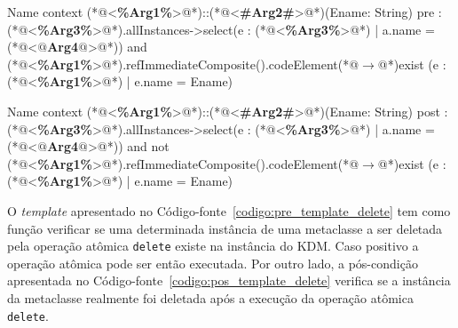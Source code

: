 \begin{codigo}[caption={[\textit{Template} OCL para realizar a pré-condição da operação atômica \texttt{delete}.] \textit{Template} OCL para realizar a pré-condição da operação atômica \texttt{delete}.},escapeinside={(*@}{@*)}, basicstyle=\footnotesize, label={codigo:pre_template_delete}, language=OCL]{Name}
context (*@<\textbf{\%Arg1\%}>@*)::(*@<\textbf{\#Arg2\#}>@*)(Ename: String)
pre : (*@<\textbf{\%Arg3\%}>@*).allInstances->select(e : (*@<\textbf{\%Arg3\%}>@*) | a.name = (*@<\textbf{$@$Arg4$@$}>@*)) and (*@<\textbf{\%Arg1\%}>@*).refImmediateComposite().codeElement(*@$\rightarrow$@*)exist (e : (*@<\textbf{\%Arg1\%}>@*) | e.name = Ename)
\end{codigo}

\begin{codigo}[caption={[\textit{Template} OCL para realizar a pós-condição da operação atômica \texttt{delete}.] \textit{Template} OCL para realizar a pós-condição da operação atômica \texttt{delete}.},escapeinside={(*@}{@*)}, basicstyle=\footnotesize, label={codigo:pos_template_delete}, language=OCL]{Name}
context (*@<\textbf{\%Arg1\%}>@*)::(*@<\textbf{\#Arg2\#}>@*)(Ename: String)
post : (*@<\textbf{\%Arg3\%}>@*).allInstances->select(e : (*@<\textbf{\%Arg3\%}>@*) | a.name = (*@<\textbf{$@$Arg4$@$}>@*)) and not (*@<\textbf{\%Arg1\%}>@*).refImmediateComposite().codeElement(*@$\rightarrow$@*)exist (e : (*@<\textbf{\%Arg1\%}>@*) | e.name = Ename)
\end{codigo}

O \textit{template} apresentado no Código-fonte~\ref{codigo:pre_template_delete} tem como função verificar se uma determinada instância de uma metaclasse a ser deletada pela operação atômica \texttt{delete} existe na instância do KDM. Caso positivo a operação atômica pode ser então executada. Por outro lado, a pós-condição apresentada no Código-fonte~\ref{codigo:pos_template_delete} verifica se a instância da metaclasse realmente foi deletada após a execução da operação atômica \texttt{delete}. 

